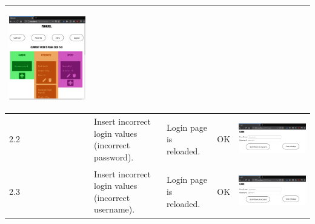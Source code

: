 \documentclass[12pt,twoside,titlepage,a4paper]{article}
\theoremstyle{definicion}
\theoremstyle{lema}
\theoremstyle{teorema}
\theoremstyle{corolario}
\theoremstyle{ejemplo}
\theoremstyle{nota}
\begin{document}
\begin{table}[!h]
\begin{tabular}{|m{0.6cm}|m{2.9cm}|m{3.6cm}|m{1.1cm}|m{5.9cm}|}
		\begin{center}\includegraphics[scale=0.3]{login2-userpage1.png}\end{center} \\
		\hline
		2.2 & Insert incorrect login values (incorrect password). & Login page is reloaded. & OK &
		\begin{center}\includegraphics[scale=0.3]{register2-login1.png}\end{center} \\
		\hline
		2.3 & Insert incorrect login values (incorrect username). & Login page is reloaded. & OK &
		\begin{center}\includegraphics[scale=0.3]{register2-login1.png}\end{center} \\

\end{tabular}
\end{table}
\end{document}
